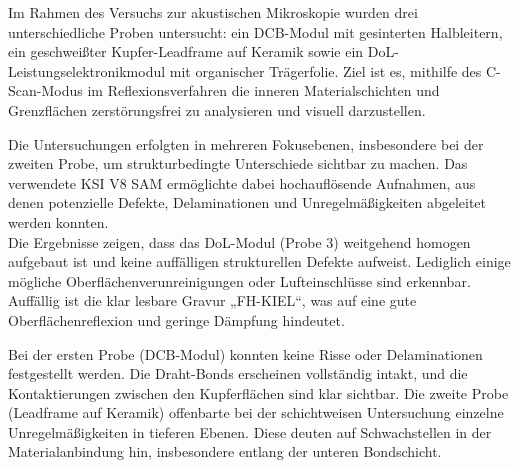 
Im Rahmen des Versuchs zur akustischen Mikroskopie wurden drei unterschiedliche Proben untersucht: ein DCB-Modul mit gesinterten Halbleitern, ein geschweißter Kupfer-Leadframe auf Keramik sowie ein DoL-Leistungselektronikmodul mit organischer Trägerfolie. Ziel ist es, mithilfe des C-Scan-Modus im Reflexionsverfahren die inneren Materialschichten und Grenzflächen zerstörungsfrei zu analysieren und visuell darzustellen.

Die Untersuchungen erfolgten in mehreren Fokusebenen, insbesondere bei der zweiten Probe, um strukturbedingte Unterschiede sichtbar zu machen. Das verwendete KSI V8 SAM ermöglichte dabei hochauflösende Aufnahmen, aus denen potenzielle Defekte, Delaminationen und Unregelmäßigkeiten abgeleitet werden konnten.\\
Die Ergebnisse zeigen, dass das DoL-Modul (Probe 3) weitgehend homogen aufgebaut ist und keine auffälligen strukturellen Defekte aufweist. Lediglich einige mögliche Oberflächenverunreinigungen oder Lufteinschlüsse sind erkennbar. Auffällig ist die klar lesbare Gravur „FH-KIEL“, was auf eine gute Oberflächenreflexion und geringe Dämpfung hindeutet.

Bei der ersten Probe (DCB-Modul) konnten keine Risse oder Delaminationen festgestellt werden. Die Draht-Bonds erscheinen vollständig intakt, und die Kontaktierungen zwischen den Kupferflächen sind klar sichtbar. Die zweite Probe (Leadframe auf Keramik) offenbarte bei der schichtweisen Untersuchung einzelne Unregelmäßigkeiten in tieferen Ebenen. Diese deuten auf Schwachstellen in der Materialanbindung hin, insbesondere entlang der unteren Bondschicht.